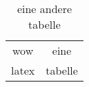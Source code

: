 \begin{table} 
    \begin{tabular}{ c c }
        wow & eine \\ 
        latex & tabelle \\ 
    \end{tabular} 
    \caption{eine andere tabelle} 
\end{table}